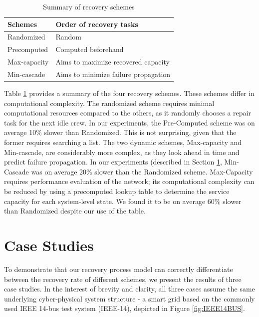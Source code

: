 \documentclass[runningheads]{llncs}
\begin{document}
\begin{table}[!htbp]
  \centering
\caption{Summary of recovery schemes}
\label{table:recovery}
\begin{tabular}{|l|l|}
\hline
    \textbf{Schemes}                         & \textbf{Order of recovery tasks}    \\ \hline
    Randomized    & Random                               \\ \hline
    Precomputed                             & Computed beforehand                  \\ \hline
    Max-capacity \cite{yan_dynamic_2021}     & Aims to maximize recovered capacity   \\ \hline
    Min-cascade                              & Aims to minimize failure propagation  \\ \hline
\end{tabular}
\end{table}

Table \ref{table:recovery} provides a summary of the four recovery schemes. These schemes differ in computational complexity. The randomized scheme requires minimal computational resources compared to the others, as it randomly chooses a repair task for the next idle crew. In our experiments, the Pre-Computed scheme was on average 10\% slower than Randomized. This is not surprising, given that the former requires searching a list. The two dynamic schemes, Max-capacity and Min-cascade, are considerably more complex, as they look ahead in time and predict failure propagation. In our experiments (described in Section \ref{sec:case}, Min-Cascade was on average 20\% slower than the Randomized scheme. Max-Capacity requires performance evaluation of the network; its computational complexity can be reduced by using a precomputed lookup table to determine the service capacity for each system-level state. We found it to be on average 60\% slower than Randomized despite our use of the table. 

\section{Case Studies}
\label{sec:case}
To demonstrate that our recovery process model can correctly differentiate between the recovery rate of different schemes, we present the results of three case studies. In the interest of brevity and clarity, all three cases assume the same underlying cyber-physical system structure - a smart grid based on the commonly used IEEE 14-bus test system (IEEE-14), depicted in Figure \ref{fig:IEEE14BUS}. 
\end{document}
